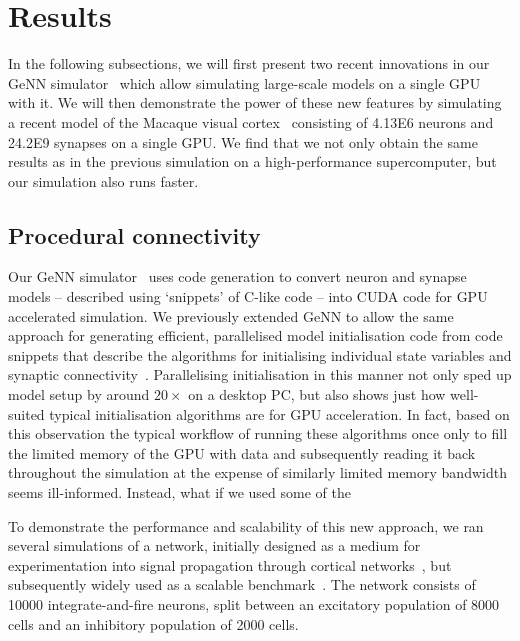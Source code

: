 \documentclass[9pt,twocolumn,twoside,lineno]{pnas-new}
\begin{document}
\section*{Results}
In the following subsections, we will first present two recent innovations in our GeNN simulator~\citep{Yavuz2016} which allow simulating large-scale models on a single GPU with it.
We will then demonstrate the power of these new features by simulating a recent model of the Macaque visual cortex~\citep{Schmidt2018} consisting of \num{4.13E6} neurons and \num{24.2E9} synapses on a single GPU.
We find that we not only obtain the same results as in the previous simulation on a high-performance supercomputer, but our simulation also runs faster.

\subsection*{Procedural connectivity}
Our GeNN simulator~\citep{Yavuz2016} uses code generation to convert neuron and synapse models -- described using `snippets' of C-like code -- into CUDA code for GPU accelerated simulation.
We previously extended GeNN to allow the same approach for generating efficient, parallelised model initialisation code from code snippets that describe the algorithms for initialising individual state variables and synaptic connectivity~\citep{Knight2018}.
Parallelising initialisation in this manner not only sped up model setup by around $20\times$ on a desktop PC, but also shows just how well-suited typical initialisation algorithms are for GPU acceleration.
In fact, based on this observation the typical workflow of running these algorithms once only to fill the limited memory of the GPU with data and subsequently reading it back throughout the simulation at the expense of similarly limited memory bandwidth seems ill-informed.
Instead, what if we used some of the 

To demonstrate the performance and scalability of this new approach, we ran several simulations of a network, initially designed as a medium for experimentation into signal propagation through cortical networks~\citep{Vogels2005}, but subsequently  widely used as a scalable benchmark~\citep{Brette2007}.
The network consists of \num{10000} integrate-and-fire neurons, split between an excitatory population of \num{8000} cells and an inhibitory population of \num{2000} cells.
\end{document}
